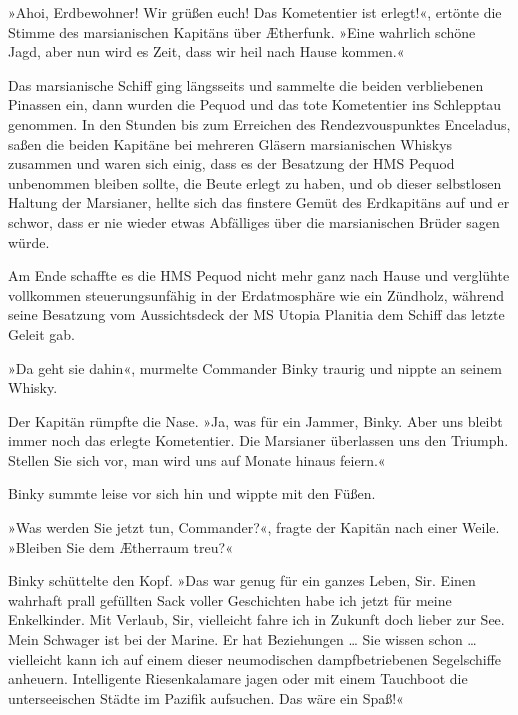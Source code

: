»Ahoi, Erdbewohner! Wir grüßen euch! Das Kometentier ist erlegt!«,
ertönte die Stimme des marsianischen Kapitäns über Ætherfunk. »Eine
wahrlich schöne Jagd, aber nun wird es Zeit, dass wir heil nach
Hause kommen.«

Das marsianische Schiff ging längsseits und sammelte die beiden
verbliebenen Pinassen ein, dann wurden die Pequod und das tote
Kometentier ins Schlepptau genommen. In den Stunden bis zum
Erreichen des Rendezvouspunktes Enceladus, saßen die beiden
Kapitäne bei mehreren Gläsern marsianischen Whiskys zusammen und
waren sich einig, dass es der Besatzung der HMS Pequod unbenommen
bleiben sollte, die Beute erlegt zu haben, und ob dieser
selbstlosen Haltung der Marsianer, hellte sich das finstere Gemüt
des Erdkapitäns auf und er schwor, dass er nie wieder etwas
Abfälliges über die marsianischen Brüder sagen würde.

\bigpar

Am Ende schaffte es die HMS Pequod nicht mehr ganz nach Hause und
verglühte vollkommen steuerungsunfähig in der Erdatmosphäre wie ein
Zündholz, während seine Besatzung vom Aussichtsdeck der MS Utopia
Planitia dem Schiff das letzte Geleit gab.

\bigpar

»Da geht sie dahin«, murmelte Commander Binky traurig und nippte an
seinem Whisky.

Der Kapitän rümpfte die Nase. »Ja, was für ein Jammer, Binky. Aber
uns bleibt immer noch das erlegte Kometentier. Die Marsianer
überlassen uns den Triumph. Stellen Sie sich vor, man wird uns auf
Monate hinaus feiern.«

Binky summte leise vor sich hin und wippte mit den Füßen.

»Was werden Sie jetzt tun, Commander?«, fragte der Kapitän nach
einer Weile. »Bleiben Sie dem Ætherraum treu?«

Binky schüttelte den Kopf. »Das war genug für ein ganzes Leben,
Sir. Einen wahrhaft prall gefüllten Sack voller Geschichten habe
ich jetzt für meine Enkelkinder. Mit Verlaub, Sir, vielleicht fahre
ich in Zukunft doch lieber zur See. Mein Schwager ist bei der
Marine. Er hat Beziehungen \ldots{} Sie wissen schon \ldots{} vielleicht kann
ich auf einem dieser neumodischen dampfbetriebenen Segelschiffe
anheuern. Intelligente Riesenkalamare jagen oder mit einem
Tauchboot die unterseeischen Städte im Pazifik aufsuchen. Das wäre
ein Spaß!«



